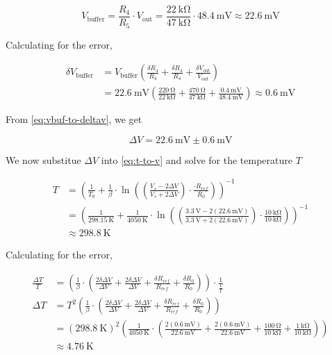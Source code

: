 \documentclass[12pt,a4paper]{article}
\begin{document}
\begin{equation*}
    V_{\text{buffer}} =  \frac{R_4}{R_5} \cdot V_{\text{out}}
    =  \frac{\SI{22}{\kilo\ohm}}{\SI{47}{\kilo\ohm}} \cdot \SI{48.4}{\milli\volt} \approx \SI{22.6}{\milli\volt}
\end{equation*}

Calculating for the error,

\begin{align*}
    \delta V_{\text{buffer}} 
    &= V_{\text{buffer}} (\frac{\delta R_4}{R_4} + \frac{\delta R_4}{R_4} + \frac{\delta V_{\text{out}}}{V_{\text{out}}}) \\
    &= \SI{22.6}{\milli\volt} (\frac{\SI{220}{\ohm}}{\SI{22}{\kilo\ohm}} + \frac{\SI{470}{\ohm}}{\SI{47}{\kilo\ohm}} + \frac{\SI{0.4}{\milli\volt}}{\SI{48.4}{\milli\volt}}) \approx \SI{0.6}{\milli\volt}
\end{align*}

From \eqref{eq:vbuf-to-deltav}, we get

\begin{equation*}
    \Delta V = \SI{22.6}{\milli\volt} \pm \SI{0.6}{\milli\volt}
\end{equation*}

We now substitue $\Delta V$ into \eqref{eq:t-to-v} and solve for the temperature $T$

\begin{align*}
    T &= \left(\frac{1}{T_0} + \frac{1}{\beta} \cdot \ln{\left( \left(\frac{V_s - 2\Delta V}{V_s + 2\Delta V}\right) \cdot \frac{ \cdot R_{ref}}{R_0}\right)}\right)^{-1} \\
    &= \left(\frac{1}{\SI{298.15}{\kelvin}} + \frac{1}{\SI{4050}{\kelvin}} \cdot \ln{\left( \left(\frac{\SI{3.3}{\volt} - 2(\SI{22.6}{\milli\volt})}{\SI{3.3}{\volt} + 2(\SI{22.6}{\milli\volt})}\right) \cdot \frac{\SI{10}{\kilo\ohm}}{\SI{10}{\kilo\ohm}}\right)}\right)^{-1} \\
    &\approx \SI{298.8}{\kelvin}
\end{align*}

Calculating for the error, 

\begin{align*}
    \frac{\Delta T}{T} &= \left(\frac{1}{\beta} \cdot \left( \frac{2\delta \Delta V}{\Delta V} + \frac{2\delta \Delta V}{\Delta V} + \frac{\delta R_{ref}}{R_{ref}} + \frac{\delta R_0}{R_0} \right) \right) \cdot \frac{1}{\frac{1}{T}} \\
    \Delta T &= T^2 \left(\frac{1}{\beta} \cdot \left( \frac{2\delta \Delta V}{\Delta V} + \frac{2\delta \Delta V}{\Delta V} + \frac{\delta R_{ref}}{R_{ref}} + \frac{\delta R_0}{R_0} \right) \right) \\
    &= (\SI{298.8}{\kelvin})^2\left(\frac{1}{\SI{4050}{\kelvin}} \cdot \left( \frac{2(\SI{0.6}{\milli\volt})}{\SI{22.6}{\milli\volt}} + \frac{2(\SI{0.6}{\milli\volt})}{\SI{22.6}{\milli\volt}} + \frac{\SI{100}{\ohm}}{\SI{10}{\kilo\ohm}} + \frac{\SI{1}{\kilo\ohm}}{\SI{10}{\kilo\ohm}} \right) \right) \\
    &\approx \SI{4.76}{\kelvin}
\end{align*}
\end{document}
